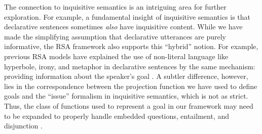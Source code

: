 \documentclass[11pt, floatsintext]{apa6}
\begin{document}
The connection to inquisitive semantics is an intriguing area for further exploration. %
For example, a fundamental insight of inquisitive semantics is that declarative sentences sometimes \emph{also} have inquisitive content.
While we have made the simplifying assumption that declarative utterances are purely informative, the RSA framework also supports this ``hybrid'' notion.
For example, previous RSA models have explained the use of non-literal language like hyperbole, irony, and metaphor in declarative sentences by the same mechanism: providing information about the speaker's goal \cite{KaoEtAl2014-Cogsci,KaoGoodman15_IronyCogSci,KaoWuBergenGoodman14_NonliteralNumberWords}.
A subtler difference, however, lies in the correspondence between the projection function we have used to define goals and the ``issue'' formalism in inquisitive semantics, which is not as strict. 
Thus, the class of functions used to represent a goal in our framework may need to be expanded to properly handle embedded questions, entailment, and disjunction \cite{ciardelli2018inquisitive}.



\end{document}
